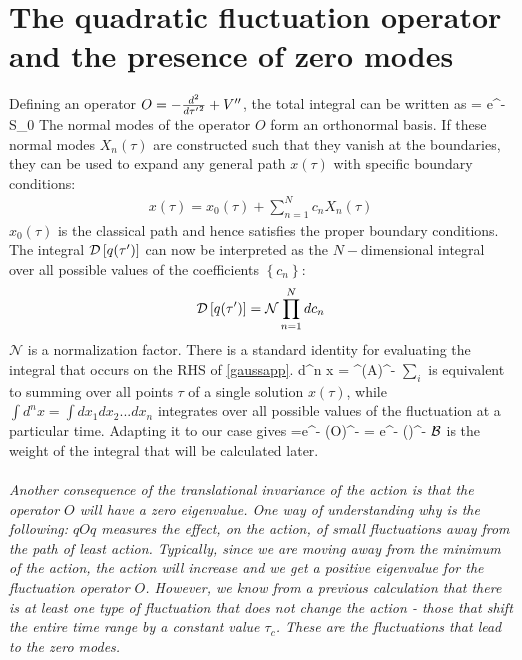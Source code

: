 \documentclass{article}
\begin{document}
\section{The quadratic fluctuation operator and the presence of zero modes}
Defining an operator \(O = -\frac{d^2}{d{\tau^\prime}^2} + V^{\prime\prime}\), the total integral can be written as
\beq[gaussapp]
\int {} = e^{-S_0} \int {}
\eeq
The normal modes of the operator \(O\) form an orthonormal basis. If these normal modes \(X_n(\tau)\) are constructed such that they vanish at the boundaries, they can be used to expand any general path \(x(\tau)\) with specific boundary conditions:
\begin{equation}\begin{aligned}
	x(\tau) = x_0(\tau) + \sum_{n=1}^N c_n X_n(\tau)
\end{aligned}\end{equation}
\(x_0(\tau)\) is the classical path and hence satisfies the proper boundary conditions. The integral \(\mathcal{D}\left[{q(\tau^\prime)}\right]\) can now be interpreted as the \(N-\)dimensional integral over all possible values of the coefficients \(\left\{ c_n \right\} \):
\begin{equation}\begin{aligned}
	\mathcal{D}\left[{q(\tau^\prime)}\right] = \mathcal{N}\prod_{n=1}^N dc_n
\end{aligned}\end{equation}
\(\mathcal{N}\) is a normalization factor. There is a standard identity for evaluating the integral that occurs on the RHS of  \ref{gaussapp}.
\beq
\int d^n x  = \rr{2\pi}^\left(\;A\right)^{-}
\eeq
\(\sum_i\) is equivalent to summing over all points \(\tau\) of a single solution \(x(\tau)\), while \(\int d^n x = \int d x_1 d x_2 ... dx_n\) integrates over all possible values of the fluctuation at a particular time.
Adapting it to our case gives
\beq
\int {} =e^{-}  \left(\;O\right)^{-} = e^{-}  \left(\right)^{- }
\eeq
\(\mathcal{B}\) is the weight of the integral that will be calculated later. 
\\\\
\textit{Another consequence of the translational invariance of the action is that the operator \(O\) will have a zero eigenvalue. One way of understanding why is the following: \(qOq\) measures the effect, on the action, of small fluctuations away from the path of least action. Typically, since we are moving away from the minimum of the action, the action will increase and we get a positive eigenvalue for the fluctuation operator \(O\). However, we know from a previous calculation that there is at least one type of fluctuation that does not change the action - those that shift the entire time range by a constant value \(\tau_c\). These are the fluctuations that lead to the zero modes.}\\\\
\end{document}
